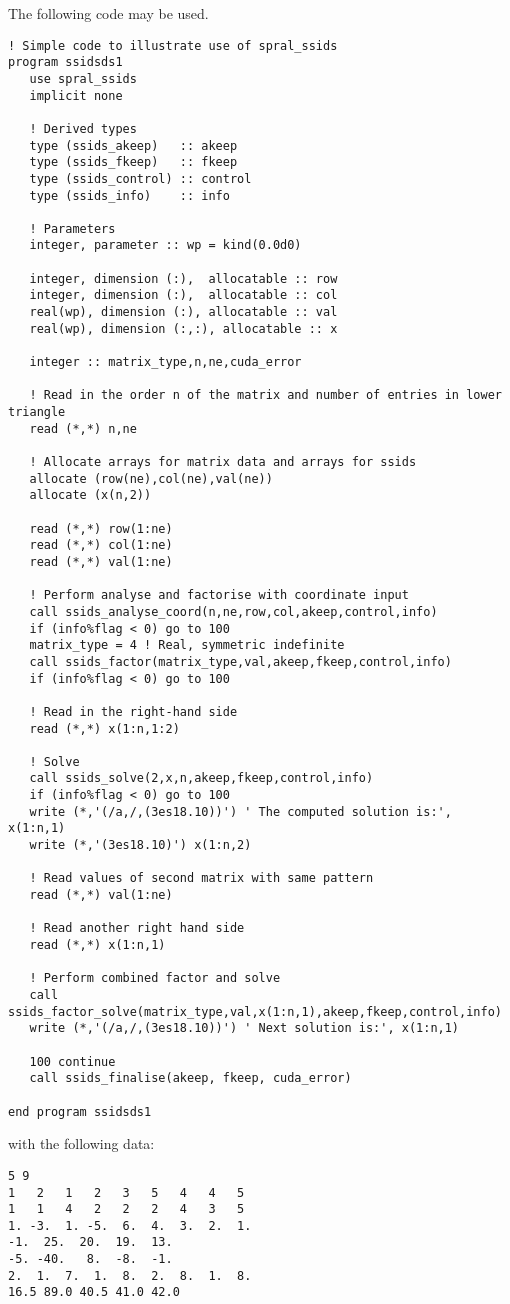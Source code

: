 \documentclass{spral}
\begin{document}
\noindent
The following code may be used.
\begin{verbatim}
! Simple code to illustrate use of spral_ssids
program ssidsds1
   use spral_ssids
   implicit none

   ! Derived types
   type (ssids_akeep)   :: akeep
   type (ssids_fkeep)   :: fkeep
   type (ssids_control) :: control
   type (ssids_info)    :: info

   ! Parameters
   integer, parameter :: wp = kind(0.0d0)

   integer, dimension (:),  allocatable :: row
   integer, dimension (:),  allocatable :: col
   real(wp), dimension (:), allocatable :: val
   real(wp), dimension (:,:), allocatable :: x

   integer :: matrix_type,n,ne,cuda_error

   ! Read in the order n of the matrix and number of entries in lower triangle
   read (*,*) n,ne

   ! Allocate arrays for matrix data and arrays for ssids
   allocate (row(ne),col(ne),val(ne))
   allocate (x(n,2))

   read (*,*) row(1:ne)
   read (*,*) col(1:ne)
   read (*,*) val(1:ne)

   ! Perform analyse and factorise with coordinate input
   call ssids_analyse_coord(n,ne,row,col,akeep,control,info)
   if (info%flag < 0) go to 100
   matrix_type = 4 ! Real, symmetric indefinite
   call ssids_factor(matrix_type,val,akeep,fkeep,control,info)
   if (info%flag < 0) go to 100

   ! Read in the right-hand side
   read (*,*) x(1:n,1:2)

   ! Solve
   call ssids_solve(2,x,n,akeep,fkeep,control,info)
   if (info%flag < 0) go to 100
   write (*,'(/a,/,(3es18.10))') ' The computed solution is:', x(1:n,1)
   write (*,'(3es18.10)') x(1:n,2)

   ! Read values of second matrix with same pattern
   read (*,*) val(1:ne)

   ! Read another right hand side
   read (*,*) x(1:n,1)

   ! Perform combined factor and solve
   call ssids_factor_solve(matrix_type,val,x(1:n,1),akeep,fkeep,control,info)
   write (*,'(/a,/,(3es18.10))') ' Next solution is:', x(1:n,1)

   100 continue
   call ssids_finalise(akeep, fkeep, cuda_error)

end program ssidsds1
\end{verbatim}
\noindent
with the following data:
\begin{verbatim}
5 9
1   2   1   2   3   5   4   4   5
1   1   4   2   2   2   4   3   5
1. -3.  1. -5.  6.  4.  3.  2.  1.
-1.  25.  20.  19.  13.
-5. -40.   8.  -8.  -1.
2.  1.  7.  1.  8.  2.  8.  1.  8.
16.5 89.0 40.5 41.0 42.0
\end{verbatim}
\end{document}
